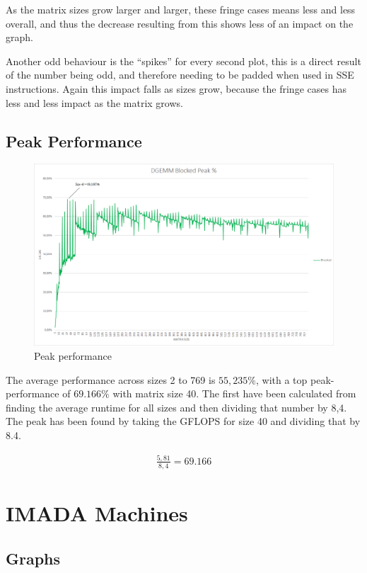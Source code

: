 \documentclass[a4paper,11pt,oneside]{book}
\begin{document}
As the matrix sizes grow larger and larger, these fringe cases means less and less overall, and thus the decrease resulting from this shows less of an impact on the graph.

Another odd behaviour is the ``spikes'' for every second plot, this is a direct result of the number being odd, and therefore needing to be padded when used in SSE instructions. Again this impact falls as sizes grow, because the fringe cases has less and less impact as the matrix grows.

\subsection{Peak Performance}

\begin{figure}[H]
  \centering
  \includegraphics[width=0.9\linewidth]{peak-graph.png}
  \caption{Peak performance}
  \centering
  \label{fig:sub1}
\end{figure}

The average performance across sizes 2 to 769 is $55,235\%$, with a top peak-performance of $69.166\%$ with matrix size 40. The first have been calculated from finding the average runtime for all sizes and then dividing that number by 8,4. The peak has been found by taking the GFLOPS for size 40 and dividing that by 8.4.

\begin{align*}
\frac{5,81}{8,4} = 69.166%
\end{align*}

\section{IMADA Machines}
\subsection{Graphs}
\end{document}
